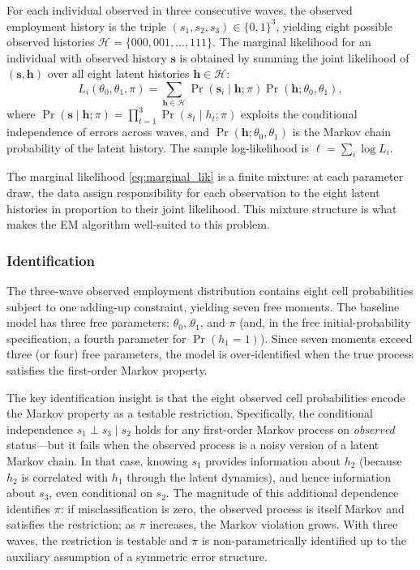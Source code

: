 For each individual observed in three consecutive waves, the observed
employment history is the triple $(s_1, s_2, s_3) \in \{0,1\}^3$, yielding
eight possible observed histories $\mathcal{H} = \{000, 001, \ldots, 111\}$.
The marginal likelihood for an individual with observed history $\mathbf{s}$
is obtained by summing the joint likelihood of $(\mathbf{s}, \mathbf{h})$
over all eight latent histories $\mathbf{h} \in \mathcal{H}$:
\begin{equation}
  L_i(\theta_0, \theta_1, \pi) =
  \sum_{\mathbf{h} \in \mathcal{H}}
    \Pr(\mathbf{s}_i \mid \mathbf{h}; \pi)
    \Pr(\mathbf{h}; \theta_0, \theta_1),
  \label{eq:marginal_lik}
\end{equation}
where $\Pr(\mathbf{s} \mid \mathbf{h}; \pi) = \prod_{t=1}^{3} \Pr(s_t \mid h_t; \pi)$
exploits the conditional independence of errors across waves, and
$\Pr(\mathbf{h}; \theta_0, \theta_1)$ is the Markov chain probability of the
latent history. The sample log-likelihood is $\ell = \sum_i \log L_i$.

The marginal likelihood \eqref{eq:marginal_lik} is a finite mixture: at each
parameter draw, the data assign responsibility for each observation to the
eight latent histories in proportion to their joint likelihood. This mixture
structure is what makes the EM algorithm well-suited to this problem.

\subsubsection*{Identification}

The three-wave observed employment distribution contains eight cell probabilities
subject to one adding-up constraint, yielding seven free moments. The baseline
model has three free parameters: $\theta_0$, $\theta_1$, and $\pi$ (and,
in the free initial-probability specification, a fourth parameter for
$\Pr(h_1=1)$). Since seven moments exceed three (or four) free parameters,
the model is over-identified when the true process satisfies the first-order
Markov property.

The key identification insight is that the eight observed cell probabilities
encode the Markov property as a testable restriction. Specifically, the
conditional independence $s_1 \perp s_3 \mid s_2$ holds for any first-order
Markov process on \emph{observed} status---but it fails when the observed
process is a noisy version of a latent Markov chain. In that case, knowing
$s_1$ provides information about $h_2$ (because $h_2$ is correlated with $h_1$
through the latent dynamics), and hence information about $s_3$, even
conditional on $s_2$. The magnitude of this additional dependence identifies
$\pi$: if misclassification is zero, the observed process is itself Markov and
satisfies the restriction; as $\pi$ increases, the Markov violation grows.
With three waves, the restriction is testable and $\pi$ is non-parametrically
identified up to the auxiliary assumption of a symmetric error structure.

